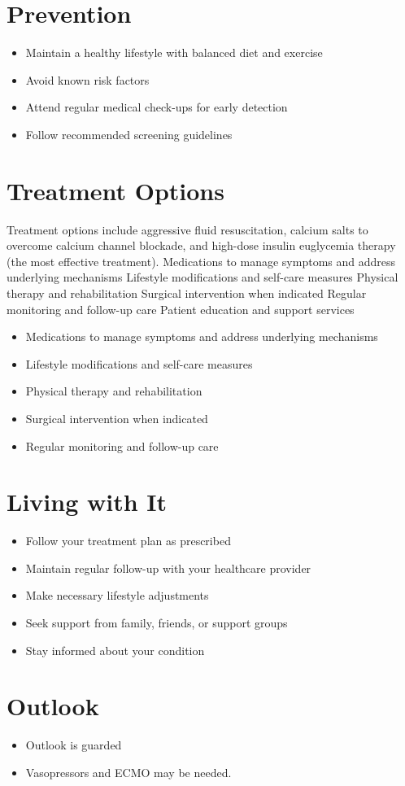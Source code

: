 \section{Prevention}
\begin{itemize}[noitemsep]
  \item Maintain a healthy lifestyle with balanced diet and exercise
  \item Avoid known risk factors
  \item Attend regular medical check-ups for early detection
  \item Follow recommended screening guidelines
\end{itemize}
\section{Treatment Options}
Treatment options include aggressive fluid resuscitation, calcium salts to overcome calcium channel blockade, and high-dose insulin euglycemia therapy (the most effective treatment). Medications to manage symptoms and address underlying mechanisms Lifestyle modifications and self-care measures Physical therapy and rehabilitation Surgical intervention when indicated Regular monitoring and follow-up care Patient education and support services

\begin{itemize}[noitemsep]
  \item Medications to manage symptoms and address underlying mechanisms
  \item Lifestyle modifications and self-care measures
  \item Physical therapy and rehabilitation
  \item Surgical intervention when indicated
  \item Regular monitoring and follow-up care
\end{itemize}
\section{Living with It}
\begin{itemize}[noitemsep]
  \item Follow your treatment plan as prescribed
  \item Maintain regular follow-up with your healthcare provider
  \item Make necessary lifestyle adjustments
  \item Seek support from family, friends, or support groups
  \item Stay informed about your condition
\end{itemize}
\section{Outlook}
\begin{itemize}[noitemsep]
  \item Outlook is guarded
  \item Vasopressors and ECMO may be needed.
\end{itemize}
